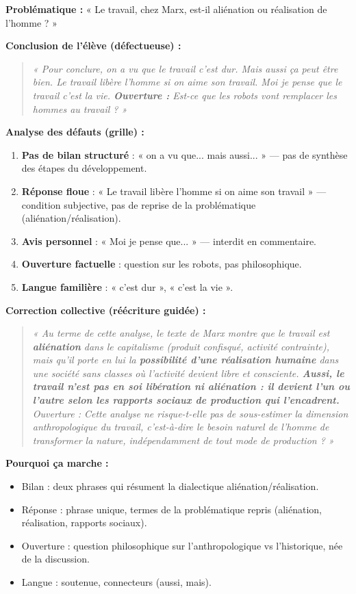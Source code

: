 \documentclass[11pt]{article}
\begin{document}
\begin{exoresolu}
\textbf{Problématique :} « Le travail, chez Marx, est-il aliénation ou réalisation de l'homme ? »

\textbf{Conclusion de l'élève (défectueuse) :}
\begin{quote}
\emph{« Pour conclure, on a vu que le travail c'est dur. Mais aussi ça peut être bien. Le travail libère l'homme si on aime son travail. Moi je pense que le travail c'est la vie. \textbf{Ouverture :} Est-ce que les robots vont remplacer les hommes au travail ? »}
\end{quote}
\tcblower
\textbf{Analyse des défauts (grille) :}
\begin{enumerate}
  \item \textbf{Pas de bilan structuré} : « on a vu que... mais aussi... » — pas de synthèse des étapes du développement.
  \item \textbf{Réponse floue} : « Le travail libère l'homme si on aime son travail » — condition subjective, pas de reprise de la problématique (aliénation/réalisation).
  \item \textbf{Avis personnel} : « Moi je pense que... » — interdit en commentaire.
  \item \textbf{Ouverture factuelle} : question sur les robots, pas philosophique.
  \item \textbf{Langue familière} : « c'est dur », « c'est la vie ».
\end{enumerate}

\textbf{Correction collective (réécriture guidée) :}

\begin{quote}
\emph{« Au terme de cette analyse, le texte de Marx montre que le travail est \textbf{aliénation} dans le capitalisme (produit confisqué, activité contrainte), mais qu'il porte en lui la \textbf{possibilité d'une réalisation humaine} dans une société sans classes où l'activité devient libre et consciente. \textbf{Aussi, le travail n'est pas en soi libération ni aliénation : il devient l'un ou l'autre selon les rapports sociaux de production qui l'encadrent.} \textit{Ouverture :} Cette analyse ne risque-t-elle pas de sous-estimer la dimension anthropologique du travail, c'est-à-dire le besoin naturel de l'homme de transformer la nature, indépendamment de tout mode de production ? »}
\end{quote}

\textbf{Pourquoi ça marche :}
\begin{itemize}
  \item Bilan : deux phrases qui résument la dialectique aliénation/réalisation.
  \item Réponse : phrase unique, termes de la problématique repris (\og aliénation\fg{}, \og réalisation\fg{}, \og rapports sociaux\fg{}).
  \item Ouverture : question philosophique sur l'anthropologique vs l'historique, née de la discussion.
  \item Langue : soutenue, connecteurs (\og aussi\fg{}, \og mais\fg{}).
\end{itemize}
\end{exoresolu}
\end{document}
